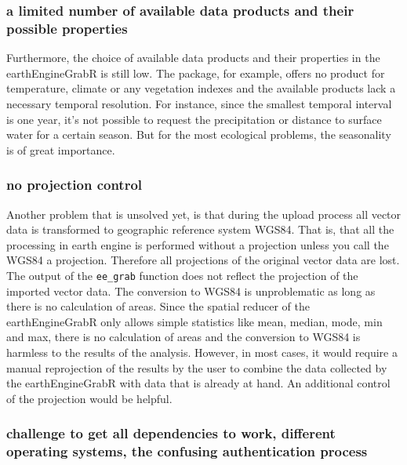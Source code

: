 \documentclass[12pt,twoside,a4paper,final]{report}
\begin{document}
\subsubsection{a limited number of available data products and their possible properties}

Furthermore, the choice of available data products and their properties in the earthEngineGrabR is still low. The package, for example, offers no product for temperature, climate or any vegetation indexes and the available products lack a necessary temporal resolution. For instance, since the smallest temporal interval is one year, it's not possible to request the precipitation or distance to surface water for a certain season. But for the most ecological problems, the seasonality is of great importance.


\subsubsection{no projection control}

Another problem that is unsolved yet, is that during the upload process all vector data is transformed to geographic reference system WGS84. That is, that all the processing in earth engine is performed without a projection unless you call the WGS84 a projection. Therefore all projections of the original vector data are lost. The output of the \texttt{ee\_grab} function does not reflect the projection of the imported vector data. The conversion to WGS84 is unproblematic as long as there is no calculation of areas. Since the spatial reducer of the earthEngineGrabR only allows simple statistics like mean, median, mode, min and max, there is no calculation of areas and the conversion to WGS84 is harmless to the results of the analysis. However, in most cases, it would require a manual reprojection of the results by the user to combine the data collected by the earthEngineGrabR with data that is already at hand. An additional control of the projection would be helpful.

\subsubsection{challenge to get all dependencies to work, different operating systems, the confusing authentication process}
 
\end{document}
